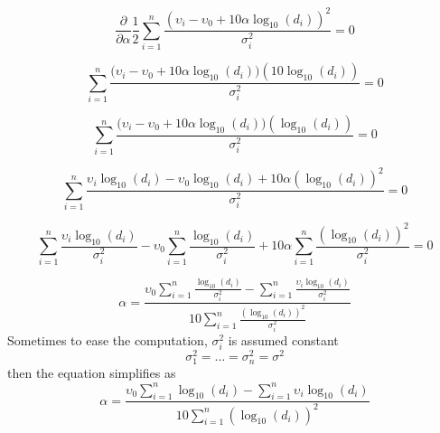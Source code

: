 \documentclass[12pt]{report}
\begin{document}
\begin{equation}
\frac{\partial}{\partial \alpha} \frac{1}{2}\sum_{i=1}^n\frac{(\upsilon_i-\upsilon_0+10\alpha\log_{10}(d_i))^2}{\sigma^2_i} =0
\end{equation}

\begin{equation}
\sum_{i=1}^n\frac{\big(\upsilon_i-\upsilon_0+10\alpha\log_{10}(d_i)\big)(10\log_{10}(d_i))}{\sigma^2_i}=0
\end{equation}

\begin{equation}
\sum_{i=1}^n\frac{\big(\upsilon_i-\upsilon_0+10\alpha\log_{10}(d_i)\big)(\log_{10}(d_i))}{\sigma^2_i}=0
\end{equation}

\begin{equation}
\sum_{i=1}^n\frac{\upsilon_i\log_{10}(d_i)-\upsilon_0\log_{10}(d_i)+10\alpha(\log_{10}(d_i))^2}{\sigma^2_i}=0
\end{equation}
\fi


\begin{equation}
\sum_{i=1}^n\frac{\upsilon_i\log_{10}(d_i)}{\sigma^2_i}-\upsilon_0\sum_{i=1}^n\frac{\log_{10}(d_i)}{\sigma^2_i}+10\alpha\sum_{i=1}^n\frac{(\log_{10}(d_i))^2}{\sigma^2_i}=0
\end{equation}

\begin{equation}
\alpha=\frac{\upsilon_0\sum_{i=1}^n\frac{\log_{10}(d_i)}{\sigma^2_i}-\sum_{i=1}^n\frac{\upsilon_i\log_{10}(d_i)}{\sigma^2_i}}{10\sum_{i=1}^n\frac{(\log_{10}(d_i))^2}{\sigma^2_i}}
\end{equation}
Sometimes to ease the computation, $\sigma^2_i$ is assumed constant $$\sigma_1^2=...=\sigma_n^2=\sigma^2$$ then the equation simplifies as
\begin{equation}
\alpha=\frac{\upsilon_0\sum_{i=1}^n\log_{10}(d_i)- \sum_{i=1}^n\upsilon_i\log_{10}(d_i)}{10\sum_{i=1}^n(\log_{10}(d_i))^2}
\end{equation}
\clearpage
\end{document}
